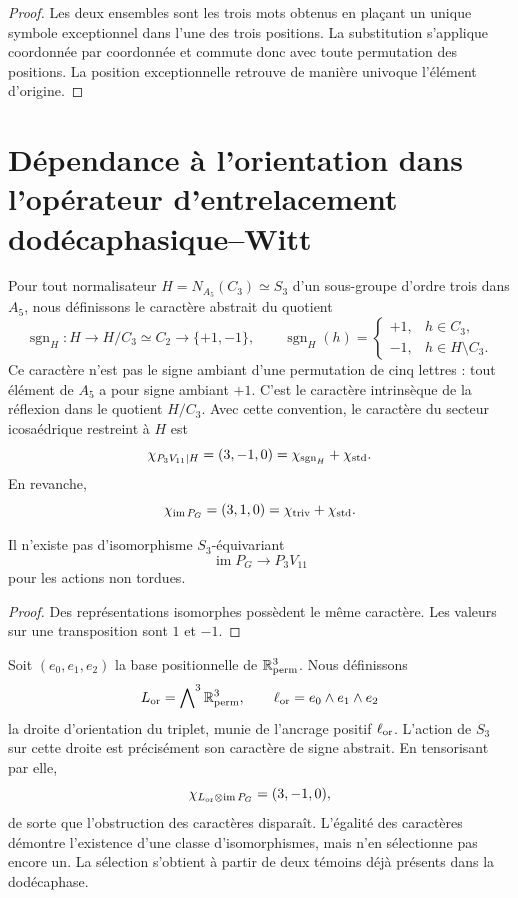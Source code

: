\begin{proof}
Les deux ensembles sont les trois mots obtenus en plaçant un unique symbole
exceptionnel dans l'une des trois positions. La substitution s'applique coordonnée par
coordonnée et commute donc avec toute permutation des positions. La
position exceptionnelle retrouve de manière univoque l'élément d'origine.
\end{proof}

\section{Dépendance à l'orientation dans l'opérateur d'entrelacement dodécaphasique--Witt}

Pour tout normalisateur \(H=N_{A_5}(C_3)\simeq S_3\) d'un sous-groupe
d'ordre trois dans \(A_5\), nous définissons le caractère abstrait du quotient
\[
 \operatorname{sgn}_H:H\longrightarrow H/C_3\simeq C_2
 \longrightarrow\{+1,-1\},
 \qquad
 \operatorname{sgn}_H(h)=
 \begin{cases}
 +1,&h\in C_3,\\
 -1,&h\in H\setminus C_3.
 \end{cases}
\]
Ce caractère n'est pas le signe ambiant d'une permutation de cinq lettres :
tout élément de \(A_5\) a pour signe ambiant \(+1\). C'est le caractère
intrinsèque de la réflexion dans le quotient \(H/C_3\). Avec cette convention, le
caractère du secteur icosaédrique restreint à \(H\) est
\[
 \chi_{P_3V_{11}|H}=(3,-1,0)
 =\chi_{\operatorname{sgn}_H}+\chi_{\rm std}.
\]
En revanche,
\[
 \chi_{\operatorname{im}P_G}=(3,1,0)
 =\chi_{\rm triv}+\chi_{\rm std}.
\]

\begin{corollary}
\label{cor:obstruccion-entrelazador-incidencia-p3}
Il n'existe pas d'isomorphisme \(S_3\)-équivariant
\[
 \operatorname{im}P_G\longrightarrow P_3V_{11}
\]
pour les actions non tordues.
\end{corollary}

\begin{proof}
Des représentations isomorphes possèdent le même caractère. Les valeurs sur une
transposition sont \(1\) et \(-1\).
\end{proof}

Soit \((e_0,e_1,e_2)\) la base positionnelle de
\(\mathbb R^3_{\rm perm}\). Nous définissons
\[
 L_{\rm or}
 =\bigwedge\nolimits^3\mathbb R^3_{\rm perm},
 \qquad
 \ell_{\rm or}=e_0\wedge e_1\wedge e_2
\]
la droite d'orientation du triplet, munie de l'ancrage positif
\(\ell_{\rm or}\). L'action de \(S_3\) sur cette droite est précisément son
caractère de signe abstrait. En tensorisant par elle,
\[
 \chi_{L_{\rm or}\otimes\operatorname{im}P_G}
 =(3,-1,0),
\]
de sorte que l'obstruction des caractères disparaît. L'égalité des
caractères démontre l'existence d'une classe d'isomorphismes, mais n'en
sélectionne pas encore un. La sélection s'obtient à partir de deux témoins déjà présents dans la
dodécaphase.

